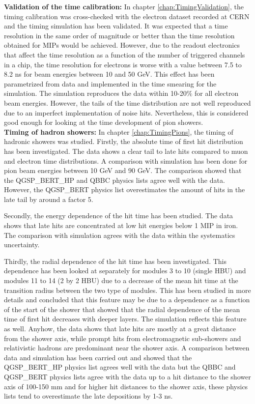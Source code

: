 \noindent\textbf{Validation of the time calibration:} In chapter \ref{chap:TimingValidation}, the timing calibration was cross-checked with the electron dataset recorded at CERN and the timing simulation has been validated. It was expected that a time resolution in the same order of magnitude or better than the time resolution obtained for MIPs would be achieved. However, due to the readout electronics that affect the time resolution as a function of the number of triggered channels in a chip, the time resolution for electrons is worse with a value between 7.5 to 8.2 ns for beam energies between 10 and 50 GeV. This effect has been parametrized from data and implemented in the time smearing for the simulation. The simulation reproduces the data within 10-20\% for all electron beam energies. However, the tails of the time distribution are not well reproduced due to an imperfect implementation of noise hits. Nevertheless, this is considered good enough for looking at the time development of pion showers.\\[0.1cm]

\noindent\textbf{Timing of hadron showers:} In chapter \ref{chap:TimingPions}, the timing of hadronic showers was studied. Firstly, the absolute time of first hit distribution has been investigated. The data shows a clear tail to late hits compared to muon and electron time distributions. A comparison with simulation has been done for pion beam energies between 10 GeV and 90 GeV. The comparison showed that the QGSP\_BERT\_HP and QBBC physics lists agree well with the data. However, the QGSP\_BERT physics list overestimates the amount of hits in the late tail by around a factor 5.

Secondly, the energy dependence of the hit time has been studied. The data shows that late hits are concentrated at low hit energies below 1 MIP in iron. The comparison with simulation agrees with the data within the systematics uncertainty.

Thirdly, the radial dependence of the hit time has been investigated. This dependence has been looked at separately for modules 3 to 10 (single HBU) and modules 11 to 14 (2 by 2 HBU) due to a decrease of the mean hit time at the transition radius between the two type of modules. This has been studied in more details and concluded that this feature may be due to a dependence as a function of the start of the shower that showed that the radial dependence of the mean time of first hit decreases with deeper layers. The simulation reflects this feature as well. Anyhow, the data shows that late hits are mostly at a great distance from the shower axis, while prompt hits from electromagnetic sub-showers and relativistic hadrons are predominant near the shower axis. A comparison between data and simulation has been carried out and showed that the QGSP\_BERT\_HP physics list agrees well with the data but the QBBC and QGSP\_BERT physics lists agree with the data up to a hit distance to the shower axis of 100-150 mm and for higher hit distances to the shower axis, these physics lists tend to overestimate the late depositions by 1-3 ns.

